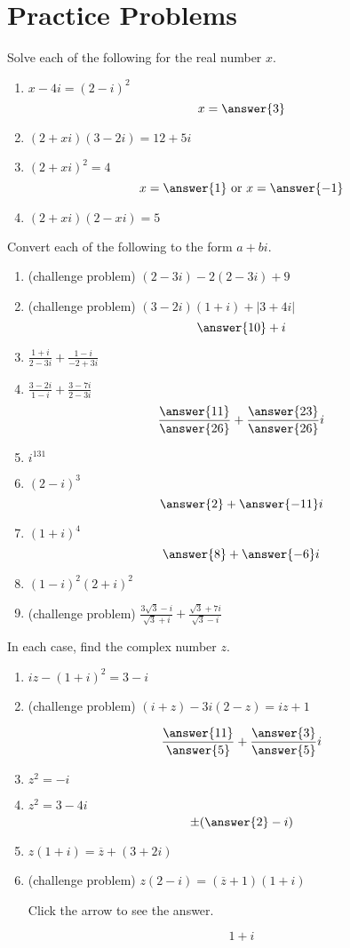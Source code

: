 \documentclass{ximera}
\begin{document}
\section*{Practice Problems}

\begin{problem}\label{prb:A.1}
Solve each of the following for the real number $x$.

\begin{enumerate}
\item $x-4i = (2-i)^2$
$$x=\answer{3}$$
\item $(2+xi)(3-2i) = 12+5i$
\item $(2+xi)^2=4$
$$x=\answer{1} \mbox{ or } x=\answer{-1}$$
\item $(2+xi)(2-xi)=5$
\end{enumerate}
\end{problem}

\begin{problem}\label{prb:A.2}
Convert each of the following to the form $a + bi$.

\begin{enumerate}
\item (challenge problem) $(2-3i)-2(2-3i)+9$
\item (challenge problem)  $(3-2i)(1+i)+|3+4i|$
$$\answer{10} + i$$
\item $\frac{1+i}{2-3i} + \frac{1-i}{-2+3i}$
\item $\frac{3-2i}{1-i} + \frac{3-7i}{2-3i}$
$$\frac{\answer{11}}{\answer{26}} + \frac{\answer{23}}{\answer{26}}i$$
\item $i^{131}$
\item $(2 - i)^{3}$
$$\answer{2} + \answer{-11}i$$
\item $(1 + i)^{4}$
$$\answer{8} +\answer{-6}i$$
\item $(1 - i)^{2}(2 + i)^{2}$
\item (challenge problem) $\frac{3\sqrt{3}-i}{\sqrt{3}+i} + \frac{\sqrt{3}+7i}{\sqrt{3}-i}$
\end{enumerate}
\end{problem}

\begin{problem}\label{prb:A.3}
In each case, find the complex number $z$.

\begin{enumerate}
\item $ iz - (1 + i)^{2} = 3 - i$
\item (challenge problem) $(i + z) - 3i(2 - z) = iz + 1$ 

$$\frac{\answer{11}}{\answer{5}} + \frac{\answer{3}}{\answer{5}}i$$

\item $z^{2} = -i$
\item $z^{2} = 3 - 4i$
$$\pm(\answer{2}-i)$$
\item $z(1+i) = \overline{z} + (3+2i)$
\item (challenge problem) $z(2-i) = (\overline{z}+1)(1+i)$

Click the arrow to see the answer.
\begin{expandable}{}{}
$$ 1 + i$$
\end{expandable}
\end{enumerate}
\end{problem}
\end{document}
